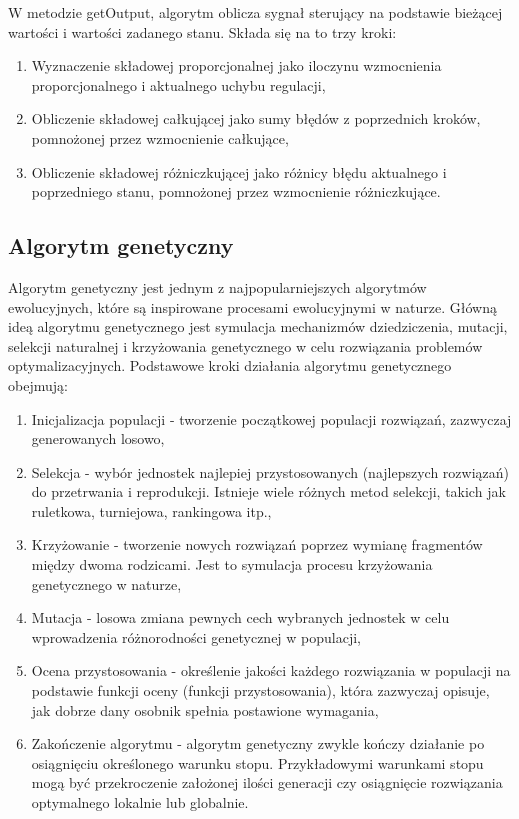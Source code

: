 \documentclass[12pt,twoside]{article}
\begin{document}
W metodzie getOutput, algorytm oblicza sygnał sterujący na podstawie bieżącej wartości i wartości zadanego stanu. Składa się na to trzy kroki:

\begin{enumerate}[label=\alph*), leftmargin=1.25cm]
	\item Wyznaczenie składowej proporcjonalnej jako iloczynu wzmocnienia proporcjonalnego i aktualnego uchybu regulacji,
	
	\item Obliczenie składowej całkującej jako sumy błędów z poprzednich kroków, pomnożonej przez wzmocnienie całkujące,
	
	\item Obliczenie składowej różniczkującej jako różnicy błędu aktualnego i poprzedniego stanu, pomnożonej przez wzmocnienie różniczkujące. 
	
\end{enumerate}

\subsection{Algorytm genetyczny}
Algorytm genetyczny jest jednym z najpopularniejszych algorytmów ewolucyjnych, które są inspirowane procesami ewolucyjnymi w naturze. Główną ideą algorytmu genetycznego jest symulacja mechanizmów dziedziczenia, mutacji, selekcji naturalnej i krzyżowania genetycznego w celu rozwiązania problemów optymalizacyjnych.
Podstawowe kroki działania algorytmu genetycznego obejmują:
\begin{enumerate}[label=\alph*), leftmargin=1.25cm]
	\item Inicjalizacja populacji - tworzenie początkowej populacji rozwiązań, zazwyczaj generowanych losowo,
	
	\item Selekcja - wybór jednostek najlepiej przystosowanych (najlepszych rozwiązań) do przetrwania i reprodukcji. Istnieje wiele różnych metod selekcji, takich jak ruletkowa, turniejowa, rankingowa itp.,
	
	\item Krzyżowanie - tworzenie nowych rozwiązań poprzez wymianę fragmentów między dwoma rodzicami. Jest to symulacja procesu krzyżowania genetycznego w naturze,
	
	\item Mutacja - losowa zmiana pewnych cech wybranych jednostek w celu wprowadzenia różnorodności genetycznej w populacji,
	
	\item Ocena przystosowania - określenie jakości każdego rozwiązania w populacji na podstawie funkcji oceny (funkcji przystosowania), która zazwyczaj opisuje, jak dobrze dany osobnik spełnia postawione wymagania,
	
	\item Zakończenie algorytmu - algorytm genetyczny zwykle kończy działanie po osiągnięciu określonego warunku stopu. Przykładowymi warunkami stopu mogą być przekroczenie założonej ilości generacji czy osiągnięcie rozwiązania optymalnego lokalnie lub globalnie. \\
	
\end{enumerate}
\end{document}
